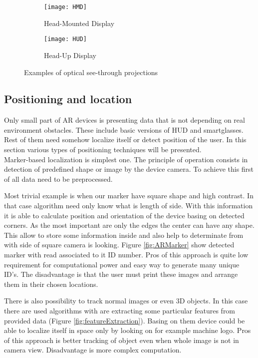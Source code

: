 \documentclass[printmode,en]{mgr}
\begin{document}
\begin{figure}[!ht]
\centering
\begin{subfigure}{.5\textwidth}
  \centering
  \texttt{[image: HMD]}
  \caption{Head-Mounted Display}
  \label{fig:headMounted}
\end{subfigure}%
\begin{subfigure}{.5\textwidth}
  \centering
  \texttt{[image: HUD]}
  \caption{Head-Up Display \cite{HUD}}
  \label{fig:headUp}
\end{subfigure}
\caption{Examples of optical see-through projections}
\label{fig:seeThroughAR}
\end{figure}

\subsection{Positioning and location}
Only small part of AR devices is presenting data that is not depending on real environment obstacles. These include basic versions of HUD and smartglasses. Rest of them need somehow localize itself or detect position of the user. In this section various types of positioning techniques will be presented.\\

Marker-based localization is simplest one. The principle of operation consists in detection of predefined shape or image by the device camera. To achieve this first of all data need to be preprocessed.

Most trivial example is when our marker have square shape and high contrast. In that case algorithm need only know what is length of side. With this information it is able to calculate position and orientation of the device basing on detected corners. As the most important are only the edges the center can have any shape. This allow to store some information inside and also help to determinate from with side of square camera is looking. Figure \ref{fig:ARMarker} show detected marker with read associated to it ID number. Pros of this approach is quite low requirement for computational power and easy way to generate many unique ID's. The disadvantage is that the user must print these images and arrange them in their chosen locations.

There is also possibility to track normal images or even 3D objects. In this case there are used algorithms with are extracting some particular features from provided data (Figure \ref{fig:featureExtraction}). Basing on them device could be able to localize itself in space only by looking on for example machine logo. Pros of this approach is better tracking of object even when whole image is not in camera view. Disadvantage is more complex computation.
\end{document}

